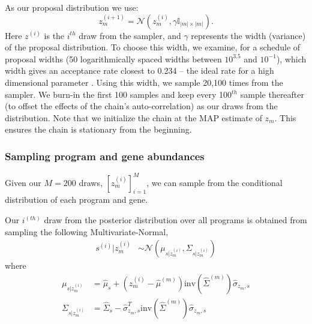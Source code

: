 \documentclass[10pt]{article}
\begin{document}
As our proposal distribution we use:
\[
z_m^{(i+1)} = \mathcal{N}\left( z_m^{(i)}, \gamma\mathbb{I}_{|m|\times |m|}\right).
\]
Here $z^{(i)}$ is the $i^{th}$ draw from the sampler, and $\gamma$ represents the width (variance) of the proposal distribution. To choose this width, we examine, for a schedule of proposal widths (50 logarithmically spaced widths between $10^{3.5}$ and $10^{-1}$), which width gives an acceptance rate closest to 0.234 -- the ideal rate for a high dimensional parameter \cite{Gelman2013}. Using this width, we sample 20,100 times from the sampler. We burn-in the first 100 samples and keep every 100$^{th}$ sample thereafter (to offset the effects of the chain's auto-correlation) as our draws from the distribution. Note that we initialize the chain at the MAP estimate of $z_m$. This ensures the chain is stationary from the beginning.

\subsubsection{Sampling program and gene abundances} 
Given our $M = 200$ draws, $\left[z^{(i)}_m\right]_{i=1}^{M}$, we can sample from the conditional distribution of each program and gene.

Our $i^{(th)}$ draw from the posterior distribution over all programs is obtained from sampling the following Multivariate-Normal,
\begin{align*}
s^{(i)}|z^{(i)}_m & \sim \mathcal{N}\left(\mu_{s| z_{m}^{(i)}}, \Sigma_{s| z_{m}^{(i)}}  \right) 
\end{align*}
where
\begin{align*}
\mu_{s| z_{m}^{(i)}}  &= \hat{\mu}_s + \left(z_m^{(i)}  - \hat{\mu}^{(m)} \right)\textrm{inv}\left( \hat{\Sigma}^{(m)} \right)\hat{\sigma}_{z_{m},s} \\
\Sigma_{s| z_{m}^{(i)}} & = \hat{\Sigma}_{s} -  \hat{\sigma}_{z_{m},s}^T  \textrm{inv}\left( \hat{\Sigma}^{(m)} \right) \hat{\sigma}_{z_{m},s}
\end{align*}
\end{document}

